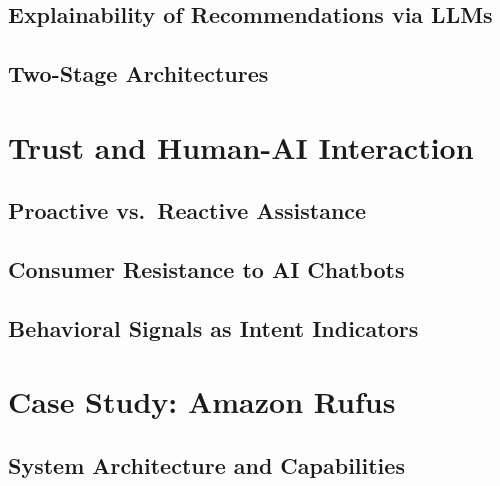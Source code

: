 \subsection{Explainability of Recommendations via LLMs}
\label{subsec:bg-explainability}


\subsection{Two-Stage Architectures}
\label{subsec:bg-two-stage}


\section{Trust and Human-AI Interaction}
\label{sec:bg-trust}

\subsection{Proactive vs.\ Reactive Assistance}
\label{subsec:bg-proactive-reactive}


\subsection{Consumer Resistance to AI Chatbots}
\label{subsec:bg-resistance}


\subsection{Behavioral Signals as Intent Indicators}
\label{subsec:bg-behavior-signals}


\section{Case Study: Amazon Rufus}
\label{sec:bg-rufus}

\subsection{System Architecture and Capabilities}
\label{subsec:bg-rufus-arch}

